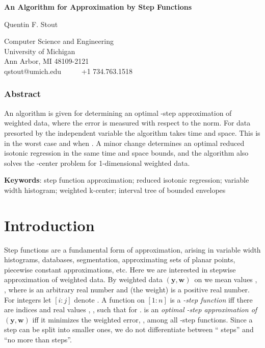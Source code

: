 \documentclass[11pt]{article}
\renewcommand{\vec}[1]{\ensuremath{\mathbf{#1}}}
\newcommand{\data}{\ensuremath{(\vec{y},\vec{w})}}
\newcommand{\inter}[2]{\ensuremath{[#1\!:\!#2]}}
\begin{document}
\begin{center}
\textbf{\Large An Algorithm for  Approximation by Step Functions}
\medskip

{\large Quentin F. Stout}
\smallskip

Computer Science and Engineering\\
University of Michigan\\
Ann Arbor, MI 48109-2121\\
qstout@umich.edu~~~~~ +1 734.763.1518
\end{center}
\vspace{-0.17in}

\subsubsection*{Abstract}
An algorithm is given for determining an optimal -step approximation of weighted data, where the error is measured with respect to the  norm.
For data presorted by the independent variable the algorithm takes  time and  space.
This is  in the worst case and  when .
A minor change determines an optimal reduced isotonic regression in the same time and space bounds,
and the algorithm also solves the -center problem for 1-dimensional weighted data.


\noindent
\textbf{Keywords}: step function approximation; reduced isotonic regression; variable width histogram; weighted k-center; interval tree of bounded envelopes



\vspace*{-0.055in}
\section{Introduction}
\vspace*{-0.055in}

Step functions are a fundamental form of approximation, arising in variable width histograms,
databases, segmentation,
approximating sets of planar points, piecewise constant approximations, etc.
Here we are interested in  stepwise approximation of weighted data.
By weighted data \data\ on  we mean values ,
, where  is an arbitrary real number and  (the weight) is a positive real number.
For integers  let \inter{i}{j} denote .
A function  on \inter{1}{n} is a
\textit{-step function} iff there are indices  and real values , , such that  for .
 is an \textit{optimal  -step approximation of \data} iff it minimizes the weighted  error, , among all -step functions.
Since a step can be split into smaller ones, we do not differentiate between `` steps'' and ``no more than  steps''.
\end{document}

